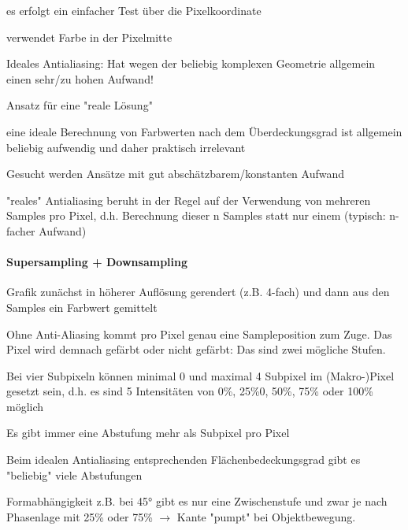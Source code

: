 \documentclass[landscape]{article}
\begin{document}
\begin{multicols}{3}
\begin{itemize*}
\begin{itemize*}
            \item es erfolgt ein einfacher Test über die Pixelkoordinate
            \item verwendet Farbe in der Pixelmitte
          \end{itemize*}
    \item Ideales Antialiasing: Hat wegen der beliebig komplexen Geometrie allgemein einen sehr/zu hohen Aufwand!
    \item Ansatz für eine "reale Lösung"
          \begin{itemize*}
            \item eine ideale Berechnung von Farbwerten nach dem Überdeckungsgrad ist allgemein beliebig aufwendig und daher praktisch irrelevant
            \item Gesucht werden Ansätze mit gut abschätzbarem/konstanten Aufwand
            \item "reales" Antialiasing beruht in der Regel auf der Verwendung von mehreren Samples pro Pixel, d.h. Berechnung dieser n Samples statt nur einem (typisch: n-facher Aufwand)
          \end{itemize*}
  \end{itemize*}
  
  \paragraph{Supersampling + Downsampling}
  \begin{itemize*}
    \item Grafik zunächst in höherer Auflösung gerendert (z.B. 4-fach) und dann aus den Samples ein Farbwert gemittelt
    \item Ohne Anti-Aliasing kommt pro Pixel genau eine Sampleposition zum Zuge. Das Pixel wird demnach gefärbt oder nicht gefärbt: Das sind zwei mögliche Stufen.
    \item Bei vier Subpixeln können minimal 0 und maximal 4 Subpixel im (Makro-)Pixel gesetzt sein, d.h. es sind 5 Intensitäten von 0\%, 25\%0, 50\%, 75\% oder 100\% möglich
    \item Es gibt immer eine Abstufung mehr als Subpixel pro Pixel
    \item Beim idealen Antialiasing entsprechenden Flächenbedeckungsgrad gibt es "beliebig" viele Abstufungen
    \item Formabhängigkeit z.B. bei 45° gibt es nur eine Zwischenstufe und zwar je nach Phasenlage mit 25\% oder 75\% $\rightarrow$ Kante "pumpt" bei Objektbewegung.
  \end{itemize*}


\end{multicols}
\end{document}
